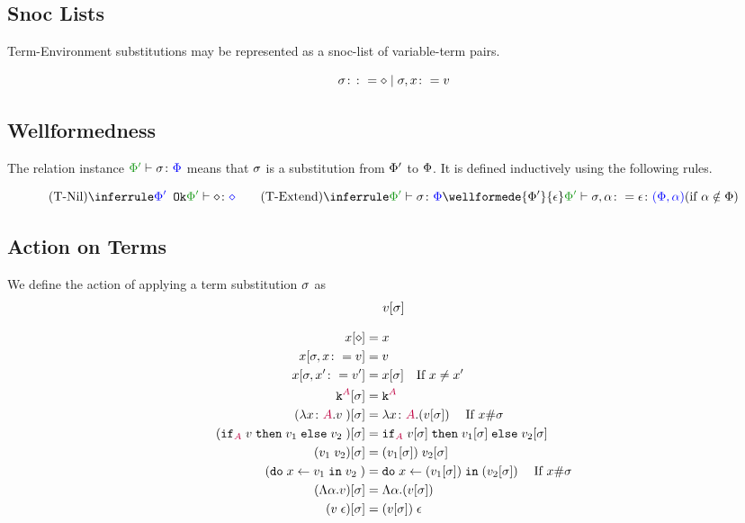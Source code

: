 \documentclass{report}
\begin{document}
    \subsection{Snoc Lists}
        Term-Environment substitutions may be represented as a snoc-list of variable-term pairs.

        \[
            \si \gens \nil \mid \si, x \setto v
        \]

    \subsection{Wellformedness}
    The relation instance $\typerelation{\P'}{\si}{\P}$ means that $\si$ is a substitution from $\P'$ to $\P$. It is defined inductively using the following rules.

    \[
        \ntreeruleI{\tsubnil}{\ok{\P'}}{\typerelation{\P'}{\nil}{\nil}}
        \quad\quad
        \condtreeruleII{\tsubextend}{\typerelation{\P'}{\si}{\P}}{\wellformede{\P'}{\e}}{\typerelation{\P'}{\si, \a \setto\e}{(\P, \a)}}{\a\notin\P}
    \]

    \subsection{Action on Terms}
         We define the action of applying a term substitution $\si$ as 
         $$v\ssi$$
         
         
         \begin{align*}
             x\sub{\nil} & = x \\
             x\sub{\si,x\setto v} & = v \\
             x\sub{\si,x'\setto v'} & = x\ssi\qt{If }x \neq x'\\
             \const{A}\ssi & = \const{A} \\
             (\lam{x}{A}{v})\ssi &= \lam{x}{A}{(v\ssi)}\qt{If }x\#\si\\
             (\pifthenelse{A}{v}{v_1}{v_2})\ssi &= \pifthenelse{A}{v\ssi}{v_1\ssi}{v_2\ssi}\\
             (\apply{v_1}{v_2})\ssi&= \apply{(v_1\ssi)}{v_2\ssi}\\
             (\doin{x}{v_1}{v_2})&= \doin{x}{(v_1\ssi)}{(v_2\ssi)}\qt{If } x\#\si\\
             (\elam{\a}{v})\ssi & = \elam{\a}{(v\ssi)}\\
             (\eapp{v}{\e})\ssi & = \eapp{(v\ssi)}{\e}\\
         \end{align*}    
\end{document}
